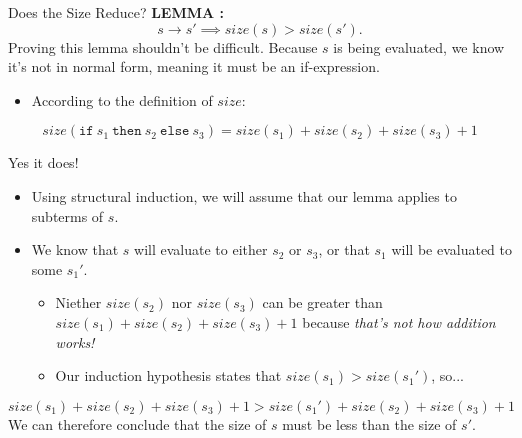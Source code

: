 \documentclass[11pt]{beamer}
\begin{document}
\begin{frame}[fragile=singleslide]{Does the Size Reduce? }
\textbf{LEMMA :}
\begin{equation}
s \rightarrow s' \implies size(s) > size(s').  
\end{equation}
Proving this lemma shouldn't be difficult.  Because $s$ is being evaluated, we know it's not in normal form, meaning it must be an if-expression.
\begin{itemize}
\item According to the definition of $size$:
\end{itemize}  
\begin{equation}
size(\texttt{if}\: s_1 \:\texttt{then}\: s_2 \:\texttt{else}\: s_3)=size(s_1) + size(s_2) + size(s_3) + 1
\end{equation}
\end{frame}

\begin{frame}[fragile=singleslide]{Yes it does!}
\begin{itemize}
\item Using structural induction, we will assume that our lemma applies to subterms of $s$.  
\item We know that $s$ will evaluate to either $s_2$ or $s_3$, or that $s_1$ will be evaluated to some $s_1'$.
\begin{itemize}
\item Niether $size(s_2)$ nor $size(s_3)$ can be greater than $size(s_1) + size(s_2) + size(s_3) + 1$ because \emph{that's not how addition works!}
\item Our induction hypothesis states that $size(s_1) > size(s_1')$, so...
\end{itemize}
\end{itemize}
\begin{equation}
size(s_1) + size(s_2) + size(s_3) + 1 > size(s_1') + size(s_2) + size(s_3) + 1
\end{equation} 
We can therefore conclude that the size of $s$ must be less than the size of $s'$.
\end{frame}
 
\end{document}
